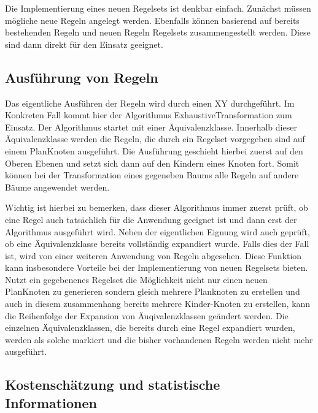 Die Implementierung eines neuen Regelsets ist denkbar einfach. Zunächst müssen mögliche neue Regeln angelegt werden. Ebenfalls können basierend auf bereits bestehenden Regeln und neuen Regeln Regelsets zusammengestellt werden. Diese sind dann direkt für den Einsatz geeignet. 


\subsection{Ausführung von Regeln}

Das eigentliche Ausführen der Regeln wird durch einen XY durchgeführt. Im Konkreten Fall kommt hier der Algorithmus ExhaustiveTransformation zum Einsatz. Der Algorithmus startet mit einer Äquivalenzklasse. Innerhalb dieser Äquivalenzklasse werden die Regeln, die durch ein Regelset vorgegeben sind auf einem PlanKnoten ausgeführt. Die Ausführung geschieht hierbei zuerst auf den Oberen Ebenen und setzt sich dann auf den Kindern eines Knoten fort. Somit können bei der Transformation eines gegeneben Baums alle Regeln auf andere Bäume angewendet werden.

Wichtig ist hierbei zu bemerken, dass dieser Algorithmus immer zuerst prüft, ob eine Regel auch tatsächlich für die Anwendung geeignet ist und dann erst der Algorithmus ausgeführt wird. Neben der eigentlichen Eignung wird auch geprüft, ob eine Äquivalenzklasse bereits vollständig expandiert wurde. Falls dies der Fall ist, wird von einer weiteren Anwendung von Regeln abgesehen. Diese Funktion kann insbesondere Vorteile bei der Implementierung von neuen Regelsets bieten. Nutzt ein gegebenenes Regelset die Möglichkeit nicht nur einen neuen PlanKnoten zu generieren sondern gleich mehrere Planknoten zu erstellen und auch in diesem zusammenhang bereits mehrere Kinder-Knoten zu erstellen, kann die Reihenfolge der Expansion von Äuqivalenzklassen geändert werden. Die einzelnen Äquivalenzklassen, die bereits durch eine Regel expandiert wurden, werden als solche markiert und die bisher vorhandenen Regeln werden nicht mehr ausgeführt.


\subsection{Kostenschätzung und statistische Informationen}





